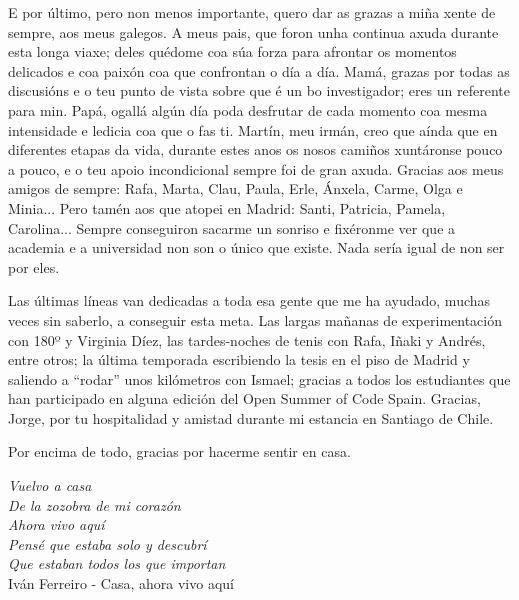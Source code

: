 \begin{acknowledgementslong}
E por último, pero non menos importante, quero dar as grazas  a miña xente de sempre, aos meus galegos. A meus pais, que foron unha continua axuda durante  esta longa viaxe; deles quédome coa súa forza para afrontar os momentos delicados e coa paixón coa que confrontan o día a día. Mamá, grazas por todas as discusións e o teu punto de vista sobre que é un bo investigador; eres un referente para min. Papá, ogallá algún día poda desfrutar de cada momento coa mesma intensidade e ledicia coa que o fas ti. Martín, meu irmán, creo que aínda que en diferentes etapas da vida, durante estes anos os nosos camiños xuntáronse pouco a pouco, e o teu apoio incondicional sempre foi de gran axuda. Gracias aos meus amigos de sempre: Rafa, Marta, Clau, Paula, Erle, Ánxela, Carme, Olga e Minia... Pero tamén aos que atopei en Madrid: Santi, Patricia, Pamela, Carolina... Sempre conseguiron sacarme un sonriso e fixéronme ver que a academia e a universidad non son o único que existe. Nada sería igual de non ser por eles.

Las últimas líneas van dedicadas a toda esa gente que me ha ayudado, muchas veces sin saberlo, a conseguir esta meta. Las largas mañanas de experimentación con 180º y Virginia Díez, las tardes-noches de tenis con Rafa, Iñaki y Andrés, entre otros; la última temporada escribiendo la tesis en el piso de Madrid y saliendo a ``rodar'' unos kilómetros con Ismael; gracias a todos los estudiantes que han participado en alguna edición del Open Summer of Code Spain. Gracias, Jorge, por tu hospitalidad y amistad durante mi estancia en Santiago de Chile.

Por encima de todo, gracias por hacerme sentir en casa.

\vspace{10mm}

\textit{
\null\hfill Vuelvo a casa \\
\null\hfill De la zozobra de mi corazón \\
\null\hfill Ahora vivo aquí \\
\null\hfill Pensé que estaba solo y descubrí \\
\null\hfill Que estaban todos los que importan \vspace{6mm} \\
} 
\null\hfill Iván Ferreiro - Casa, ahora vivo aquí

\end{acknowledgementslong}









